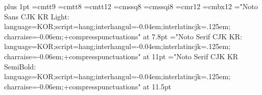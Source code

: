 %
%

\def\tangref{3} %


\acrofalse\pdffalse\pdftexfalse
\def\page{\ifvoid\footins \box255
  \else \vbox{\unvbox255 \vskip\skip\footins \footnoterule\unvbox\footins}\fi}
\normalbottom
\parskip 0pt plus 1pt
\def\RA{\char'31 } %
\def\hang{\hangindent 4em\ignorespaces}
\def\tnote#1{\footnote{$^*$}{\ninepoint 옮긴이 주: #1}}
\font\ninett=cmtt9
\font\eighttt=cmtt8
\font\twelvett=cmtt12
\font\quotermlatin=cmssq8
\font\quoteitlatin=cmssqi8
\font\authorfontlatin=cmr12
\font\sectionfontlatin=cmbx12
\sethangulfont\quotermhangul="Noto Sans CJK KR Light:%
  language=KOR;script=hang;interhangul=-0.04em;interlatincjk=.125em;%
  charraise=-0.06em;+compresspunctuations" at 7.8pt
\sethangulfont\authorhangul="Noto Serif CJK KR:%
  language=KOR;script=hang;interhangul=-0.04em;interlatincjk=.125em;%
  charraise=-0.06em;+compresspunctuations" at 11pt
\sethangulfont\sectionhangul="Noto Serif CJK KR SemiBold:%
  language=KOR;script=hang;interhangul=-0.04em;interlatincjk=.125em;%
  charraise=-0.06em;+compresspunctuations" at 11.5pt
\def\quoterm{\quotermlatin\quotermhangul}
\def\quoteit{\quoteitlatin\quotermhangul}
\def\authorfont{\authorfontlatin\authorhangul}
\def\sectionfont{\sectionfontlatin\sectionhangul}


